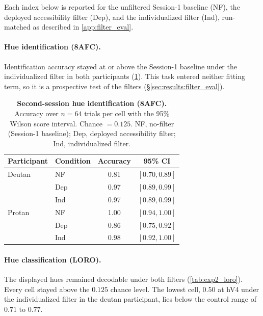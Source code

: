 

Each index below is reported for the unfiltered Session-1 baseline (NF), the deployed accessibility filter (Dep), and the individualized filter (Ind), run-matched as described in \cref{app:filter_eval}.

\paragraph{Hue identification (8AFC).}
Identification accuracy stayed at or above the Session-1 baseline under the individualized filter in both participants (\cref{tab:exp2_8afc}). This task entered neither fitting term, so it is a prospective test of the filters (\S\ref{sec:results:filter_eval}).

\begin{table}[tb]
  \centering
  \caption{\textbf{Second-session hue identification (8AFC).} Accuracy over $n = 64$ trials per cell with the 95\% Wilson score interval. Chance $= 0.125$. NF, no-filter (Session-1 baseline); Dep, deployed accessibility filter; Ind, individualized filter.}
  \label{tab:exp2_8afc}
  \begin{tabular}{llcc}
    \toprule
    Participant & Condition & Accuracy & 95\% CI \\
    \midrule
    Deutan & NF  & 0.81 & $[0.70, 0.89]$ \\
                    & Dep & 0.97 & $[0.89, 0.99]$ \\
                    & Ind & 0.97 & $[0.89, 0.99]$ \\
    \midrule
    Protan & NF  & 1.00 & $[0.94, 1.00]$ \\
                    & Dep & 0.86 & $[0.75, 0.92]$ \\
                    & Ind & 0.98 & $[0.92, 1.00]$ \\
    \bottomrule
  \end{tabular}
\end{table}

\paragraph{Hue classification (LORO).}
The displayed hues remained decodable under both filters (\cref{tab:exp2_loro}). Every cell stayed above the $0.125$ chance level. The lowest cell, $0.50$ at hV4 under the individualized filter in the deutan participant, lies below the control range of $0.71$ to $0.77$.

